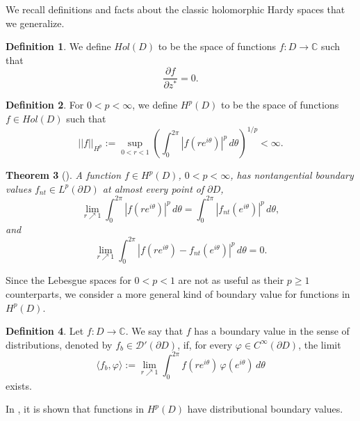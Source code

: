 \documentclass[suppldata]{interact}
\theoremstyle{plain}%
\newtheorem{theorem}{Theorem}[section]
\theoremstyle{definition}
\newtheorem{deff}[theorem]{Definition}
\theoremstyle{remark}
\newcommand{\C}{\mathbb C}
\newcommand{\p}{\partial}
\begin{document}
We recall definitions and facts about the classic holomorphic Hardy spaces that we generalize. 

\begin{deff}
    We define $Hol(D)$ to be the space of functions $f: D \to \C$ such that 
    \[
        \frac{\p f}{\p z^*} = 0. 
    \]
\end{deff}


\begin{deff}
    For $0 < p < \infty$, we define $H^p(D)$ to be the space of functions $f \in Hol(D)$ such that 
    \[
        ||f||_{H^p} := \sup_{0 < r < 1} \left( \int_0^{2\pi} |f(re^{i\theta})|^p \,d\theta \right)^{1/p} < \infty.
    \]
\end{deff}

\begin{theorem}[\cite{Duren}]\label{bvcon}
A function $f \in H^p(D)$, $0 < p < \infty$, has nontangential boundary values $f_{nt} \in L^p(\partial D)$ at almost every point of $\p D$, 
\[
\lim_{r\nearrow 1} \int_0^{2\pi} |f(re^{i\theta})|^p \, d\theta = \int_0^{2\pi} |f_{nt}(e^{i\theta})|^p \,d\theta,
\]
and
\[
\lim_{r\nearrow 1} \int_0^{2\pi} |f(re^{i\theta})- f_{nt}(e^{i\theta})|^p \, d\theta = 0.
\]
\end{theorem}

Since the Lebesgue spaces for $0 < p < 1$ are not as useful as their $p \geq 1$ counterparts, we consider a more general kind of boundary value for functions in $H^p(D)$. 

\begin{deff}\label{bvcircle}Let $f: D \to \C$. We say that $f$ has a boundary value in the sense of distributions, denoted by $f_b \in \mathcal{D}'(\p D)$, if, for every $\varphi \in C^\infty(\partial D)$, the limit
            \[
             \langle f_b, \varphi \rangle := \lim_{r \nearrow 1} \int_0^{2\pi} f(re^{i\theta}) \, \varphi(e^{i\theta}) \,d\theta
            \]
            exists.
            
\end{deff}

In \cite{GHJH2}, it is shown that functions in $H^p(D)$ have distributional boundary values. 
\end{document}

